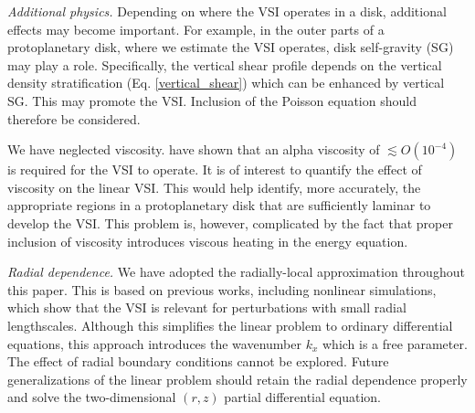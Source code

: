 \emph{Additional physics.} Depending on where the VSI operates in a
disk, additional effects may become important. For example, in the
outer parts of a protoplanetary disk, where we estimate the VSI 
operates, disk self-gravity (SG) may play a role. Specifically, the vertical
shear profile depends on the vertical density stratification
(Eq. \ref{vertical_shear}) which can be enhanced by vertical SG. This
may promote the VSI. Inclusion of the Poisson equation should
therefore be considered.  

We have neglected viscosity. \cite{nelson13} have shown that an
alpha viscosity of $\lesssim O(10^{-4})$ is required for the VSI to
operate. It is of interest to quantify the effect of viscosity
on the linear VSI. This would help identify, more accurately, the
appropriate regions in a protoplanetary disk that are sufficiently
laminar to develop the VSI.  This problem is, however, complicated by
the fact that proper inclusion of viscosity introduces viscous heating
in the energy equation. 


\emph{Radial dependence.} We have adopted the radially-local approximation 
throughout this paper. This is based on previous works, including
nonlinear simulations, which show that the VSI is relevant for
perturbations with small radial lengthscales. Although this simplifies
the linear problem to ordinary differential equations, this approach
introduces the wavenumber $k_x$ which is a free parameter. The effect
of radial boundary conditions cannot be explored. Future
generalizations of the linear problem should retain the radial
dependence properly and solve the two-dimensional $(r,z)$ partial 
differential equation.     





